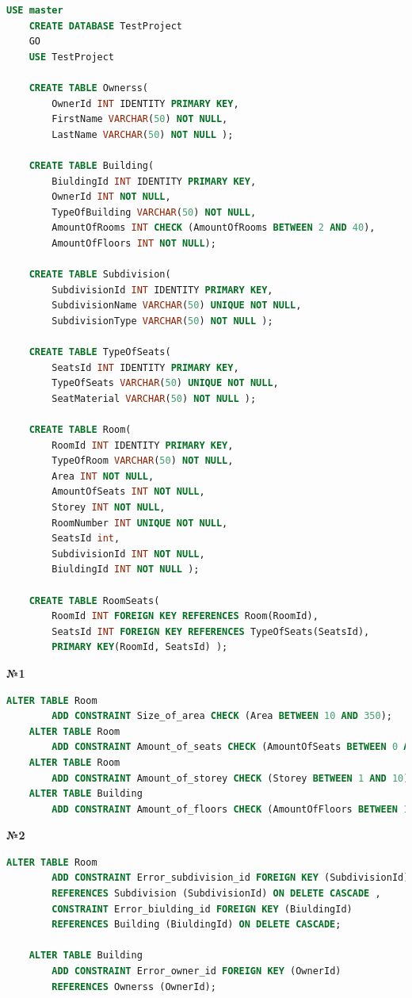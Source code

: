 \documentclass[a4paper,12pt]{article}
\begin{document}
	\begin{lstlisting}[language=SQL]
	USE master
	CREATE DATABASE TestProject
	GO
	USE TestProject
	
	CREATE TABLE Ownerss(
		OwnerId INT IDENTITY PRIMARY KEY,
		FirstName VARCHAR(50) NOT NULL,
		LastName VARCHAR(50) NOT NULL );
	
	CREATE TABLE Building(
		BiuldingId INT IDENTITY PRIMARY KEY,
		OwnerId INT NOT NULL,
		TypeOfBuilding VARCHAR(50) NOT NULL,
		AmountOfRooms INT CHECK (AmountOfRooms BETWEEN 2 AND 40),
		AmountOfFloors INT NOT NULL); 
	
	CREATE TABLE Subdivision(
		SubdivisionId INT IDENTITY PRIMARY KEY,
		SubdivisionName VARCHAR(50) UNIQUE NOT NULL,
		SubdivisionType VARCHAR(50) NOT NULL );
	
	CREATE TABLE TypeOfSeats(
		SeatsId INT IDENTITY PRIMARY KEY,
		TypeOfSeats VARCHAR(50) UNIQUE NOT NULL,
		SeatMaterial VARCHAR(50) NOT NULL ); 
	
	CREATE TABLE Room(
		RoomId INT IDENTITY PRIMARY KEY,
		TypeOfRoom VARCHAR(50) NOT NULL,
		Area INT NOT NULL, 
		AmountOfSeats INT NOT NULL, 
		Storey INT NOT NULL,
		RoomNumber INT UNIQUE NOT NULL,
		SeatsId int, 
		SubdivisionId INT NOT NULL,
		BiuldingId INT NOT NULL );
	
	CREATE TABLE RoomSeats(
		RoomId INT FOREIGN KEY REFERENCES Room(RoomId),
		SeatsId INT FOREIGN KEY REFERENCES TypeOfSeats(SeatsId),
		PRIMARY KEY(RoomId, SeatsId) );
	\end{lstlisting}
\newpage
	\begin{center}
		\textbf{№1}
	\end{center}
	\begin{lstlisting}[language=SQL]
	ALTER TABLE Room
		ADD CONSTRAINT Size_of_area CHECK (Area BETWEEN 10 AND 350);
	ALTER TABLE Room
		ADD CONSTRAINT Amount_of_seats CHECK (AmountOfSeats BETWEEN 0 AND 200);
	ALTER TABLE Room
		ADD CONSTRAINT Amount_of_storey CHECK (Storey BETWEEN 1 AND 10);
	ALTER TABLE Building
		ADD CONSTRAINT Amount_of_floors CHECK (AmountOfFloors BETWEEN 1 AND 10);
	\end{lstlisting}
	\begin{center}
		\textbf{№2}
	\end{center}
	\begin{lstlisting}[language=SQL]
	ALTER TABLE Room
		ADD CONSTRAINT Error_subdivision_id FOREIGN KEY (SubdivisionId) 
		REFERENCES Subdivision (SubdivisionId) ON DELETE CASCADE ,
		CONSTRAINT Error_biulding_id FOREIGN KEY (BiuldingId) 
		REFERENCES Building (BiuldingId) ON DELETE CASCADE;
	
	ALTER TABLE Building
		ADD CONSTRAINT Error_owner_id FOREIGN KEY (OwnerId) 
		REFERENCES Ownerss (OwnerId);
	\end{lstlisting}
\end{document}

